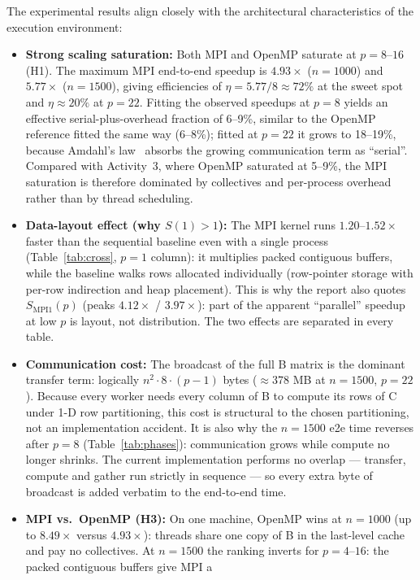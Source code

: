 \documentclass[12pt,a4paper]{article}
\begin{document}
The experimental results align closely with the architectural
characteristics of the execution environment:
\begin{itemize}
\item \textbf{Strong scaling saturation:} Both MPI and OpenMP saturate at
$p = 8$--$16$ (H1). The maximum MPI end-to-end speedup is $4.93\times$
($n = 1000$) and $5.77\times$ ($n = 1500$), giving efficiencies of
$\eta = 5.77 / 8 \approx 72\%$ at the sweet spot and $\eta \approx 20\%$ at
$p = 22$. Fitting the observed speedups at $p = 8$ yields an effective
serial-plus-overhead fraction of 6--9\%, similar to the OpenMP reference
fitted the same way (6--8\%); fitted at $p = 22$ it grows to 18--19\%,
because Amdahl's law~\cite{amdahl} absorbs the growing communication term as ``serial''.
Compared with Activity~3, where OpenMP saturated at 5--9\%, the MPI
saturation is therefore dominated by collectives and per-process overhead
rather than by thread scheduling.
\item \textbf{Data-layout effect (why $S(1) > 1$):} The MPI kernel runs
$1.20$--$1.52\times$ faster than the sequential baseline even with a single
process (Table~\ref{tab:cross}, $p = 1$ column): it multiplies packed
contiguous buffers, while the baseline walks rows allocated individually
(row-pointer storage with per-row indirection and heap placement). This is
why the report also quotes $S_{\mathrm{MPI1}}(p)$ (peaks $4.12\times$ /
$3.97\times$): part of the apparent ``parallel'' speedup at low $p$ is
layout, not distribution. The two effects are separated in every table.
\item \textbf{Communication cost:} The broadcast of the full B matrix is
the dominant transfer term: logically $n^2 \cdot 8 \cdot (p-1)$ bytes
($\approx$378 MB at $n = 1500$, $p = 22$). Because every worker needs every
column of B to compute its rows of C under 1-D row partitioning, this cost is
structural to the chosen partitioning, not an implementation accident. It is
also why the $n = 1500$ e2e time reverses after $p = 8$
(Table~\ref{tab:phases}): communication grows while compute no longer
shrinks. The current implementation performs no overlap --- transfer,
compute and gather run strictly in sequence --- so every extra byte of
broadcast is added verbatim to the end-to-end time.
\item \textbf{MPI vs.\ OpenMP (H3):} On one machine, OpenMP wins at
$n = 1000$ (up to $8.49\times$ versus $4.93\times$): threads share one copy
of B in the last-level cache and pay no collectives. At $n = 1500$ the
ranking inverts for $p = 4$--$16$: the packed contiguous buffers give MPI a

\end{itemize}
\end{document}
